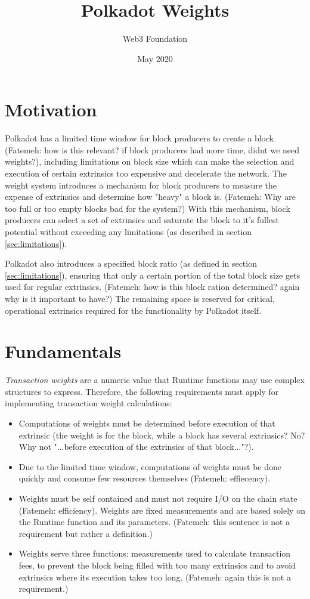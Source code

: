 \documentclass[11pt,a4paper]{article}
\begin{document}
\title{Polkadot Weights}
\author{Web3 Foundation}
\date{May 2020}
\maketitle

\section{Motivation}
Polkadot has a limited time window for block producers to create a block (Fatemeh: how is this relevant? if block producers had more time, didnt we need weights?),
including limitations on block size which can make the selection and execution
of certain extrinsics too expensive and decelerate the network. The weight
system introduces a mechanism for block producers to measure the expense of
extrinsics and determine how "heavy" a block is. (Fatemeh: Why are too full or too empty blocks bad for the system?) With this mechanism, block producers
can select a set of extrinsics and saturate the block to it's fullest potential
without exceeding any limitations (as described in section \ref{sec:limitations}).
\newline

Polkadot also introduces a specified block ratio (as defined in section \ref{sec:limitations}),
ensuring that only a certain portion of the total block size gets used for regular extrinsics. (Fatemeh: how is this block ration determined? again why is it important to have?)
The remaining space is reserved for critical, operational extrinsics required for the functionality
by Polkadot itself.

\section{Fundamentals}
\emph{Transaction weights} are a numeric value that Runtime functions may use complex structures to express. Therefore, the following requirements must apply for implementing transaction weight calculations:
\begin{itemize}
\item Computations of weights must be determined before execution of that extrinsic (the weight is for the block, while a block has several extrinsics? No? Why not "...before execution of the extrinsics of that block..."?).
\item Due to the limited time window, computations of weights must be done quickly and consume
      few resources themselves (Fatemeh: effiecency).
\item Weights must be self contained and must not require I/O on the chain state (Fatemeh: efficiency). Weights are
      fixed measurements and are based solely on the Runtime function and its parameters. (Fatemeh: this sentence is not a requirement but rather a definition.)
\item Weights serve three functions: measurements used to calculate transaction fees, to prevent
      the block being filled with too many extrinsics and to avoid extrinsics where its execution
      takes too long. (Fatemeh: again this is not a requirement.)
\end{itemize}
\end{document}
